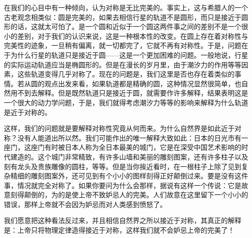 在我们的心目中有一种倾向，认为对称是无比完美的。事实上，这与希腊人的一个古老观念相类似：圆是完美的，如果去相信行星的轨道不是圆形，而只是接近于圆形的话，这就太可怕了。是一个圆和近似于一个圆这两件事之间的差别不是一个很小的差别，对于我们的认识来说，这是一种根本性的改变。在圆上存在着对称性与完美性的迹象，一旦稍有偏离，就一切都完了，它就不再有对称性。于是，问题在于为什么行星的轨道只是接近于圆——这是一个更加困难的问题。一般地说，行星的实际运动轨道应当是椭圆形的。但是在漫长的岁月里，由于潮汐力的作用等等因素，这些轨道变得几乎对称了。现在的问题是，我们这里是否也存在着类似的事情。若从圆的观点出发来看，如果轨道都是精确的圆，这种情况显然很简单，也自然用不到去解释。但是既然轨道只是接近于圆，就需要作许多解释，结果表明这是一个很大的动力学问题，于是，我们就得考虑潮汐力等等的影响来解释为什么轨道是近于对称的。

这样，我们的问题就是要解释对称性究竟从何而来。为什么自然界是如此近于对称？没有人能道出所以然。我们可能作出的唯一解释大致如此：日本的日光市有一座门，这座门有时被日本人称为全日本最美的城门，它是在深受中国艺术影响的时代建造的。这个城门非常精致，有许多山墙和美丽的雕刻图案，还有许多柱子以及刻有龙头及贵族雕像的圆柱，等等。但是当你挨近看时，在一根柱子上除了见到复杂精细的雕刻图案外，还可见到有个小小的图样刻得正好颠倒过来。要是没有这件事，情况就完全对称了。如果你要问为什么会那样，据说有这样一个传说：它是故意刻得颠倒的，为的是使上帝不致妒忌人的完美。人们故意在这里留下一个小小的错误，那样上帝就不会因为妒忌而对人类感到愤怒了。

我们愿意把这种看法反过来，并且相信自然界之所以接近于对称，其真正的解释是：上帝只将物理定律造得接近于对称，这样我们就不会妒忌上帝的完美了！